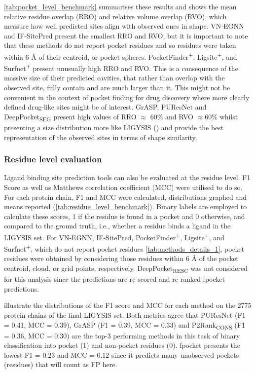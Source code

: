 \autoref{tab:pocket_level_benchmark} summarises these results and shows the mean relative residue overlap (RRO) and relative volume overlap (RVO), which measure how well predicted sites align with observed ones in shape. VN-EGNN and IF-SitePred present the smallest RRO and RVO, but it is important to note that these methods do not report pocket residues and so residues were taken within 6 \AA{} of their centroid, or pocket spheres. PocketFinder\textsuperscript{+}, Ligsite\textsuperscript{+}, and Surfnet\textsuperscript{+} present unusually high RRO and RVO. This is a consequence of the massive size of their predicted cavities, that rather than overlap with the observed site, fully contain and are much larger than it. This might not be convenient in the context of pocket finding for drug discovery where more clearly defined drug-like sites might be of interest. GrASP, PUResNet and DeepPocket\textsubscript{SEG} present high values of RRO $\approx$ 60\% and RVO $\approx$60\% whilst presenting a size distribution more like LIGYSIS () and provide the best representation of the observed sites in terms of shape similarity.

\subsubsection{Residue level evaluation}

Ligand binding site prediction tools can also be evaluated at the residue level. F1 Score as well as Matthews correlation coefficient (MCC) were utilised to do so. For each protein chain, F1 and MCC were calculated, distributions graphed and means reported (\autoref{tab:residue_level_benchmark}). Binary labels are employed to calculate these scores, 1 if the residue is found in a pocket and 0 otherwise, and compared to the ground truth, i.e., whether a residue binds a ligand in the LIGYSIS set. For VN-EGNN, IF-SitePred, PocketFinder\textsuperscript{+}, Ligsite\textsuperscript{+}, and Surfnet\textsuperscript{+}, which do not report pocket residues \autoref{tab:methods_details_1}, pocket residues were obtained by considering those residues within 6 \AA{} of the pocket centroid, cloud, or grid points, respectively. DeepPocket\textsubscript{RESC} was not considered for this analysis since the predictions are re-scored and re-ranked fpocket predictions.

 illustrate the distributions of the F1 score and MCC for each method on the 2775 protein chains of the final LIGYSIS set. Both metrics agree that PUResNet (F1 = 0.41, MCC = 0.39), GrASP (F1 = 0.39, MCC = 0.33) and P2Rank\textsubscript{CONS} (F1 = 0.36, MCC = 0.30) are the top-3 performing methods in this task of binary classification into pocket (1) and non-pocket residues (0). fpocket presents the lowest F1 = 0.23 and MCC = 0.12 since it predicts many unobserved pockets (residues) that will count as FP here.


